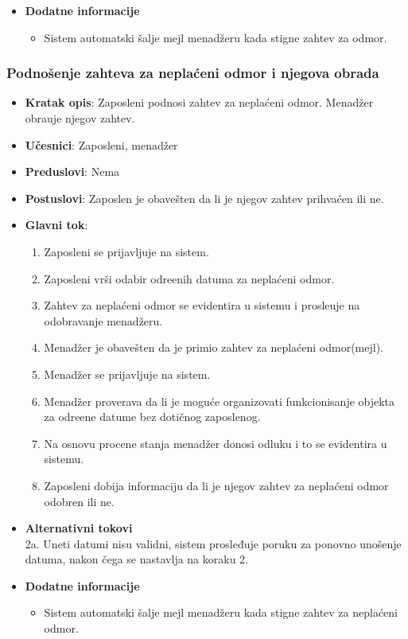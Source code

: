 \begin{itemize}
 \item \textbf{Dodatne informacije}
 \begin{itemize}
     \item Sistem automatski \v salje mejl menad\v zeru kada stigne zahtev za odmor.

 \end{itemize}
 \end{itemize}
 
 \subsubsection{Podno\v senje zahteva za nepla\'ceni odmor i njegova obrada }
 \begin{itemize}
    \item \textbf{Kratak opis}:
   Zaposleni podnosi zahtev za nepla\'ceni odmor. Menad\v zer obra\dj uje njegov zahtev.
    \item \textbf{Učesnici}:
    Zaposleni, menad\v zer
    \item \textbf{Preduslovi}: Nema
    \item \textbf{Postuslovi}:
    Zaposlen je obave\v sten da li je njegov zahtev prihva\'cen ili ne.
    \item \textbf{Glavni tok}:
    \begin{enumerate}
        \item Zaposleni se prijavljuje na sistem.
        \item Zaposleni vr\v si odabir odre\dj enih datuma za nepla\'ceni odmor.
        \item Zahtev za nepla\'ceni odmor se evidentira u sistemu i prosle\dj uje na odobravanje menad\v zeru.
        \item Menad\v zer je obave\v sten da je primio zahtev za nepla\'ceni odmor(mejl).
        \item Menad\v zer se prijavljuje na sistem.
        \item Menad\v zer proverava da li je moguće organizovati funkcionisanje objekta za odre\dj ene datume bez dotičnog zaposlenog.
        \item Na osnovu procene stanja menad\v zer donosi odluku i to se evidentira u sistemu.
        \item Zaposleni dobija informaciju da li je njegov zahtev za nepla\'ceni odmor odobren ili ne.
    \end{enumerate}
\item \textbf{Alternativni tokovi}\\
        2a. Uneti datumi nisu validni, sistem prosleđuje poruku za ponovno unošenje datuma, nakon čega se nastavlja na koraku 2.
 
 \item \textbf{Dodatne informacije}
 \begin{itemize}
     \item Sistem automatski \v salje mejl menad\v zeru kada stigne zahtev za nepla\'ceni odmor.

 \end{itemize}
 \end{itemize}
  
